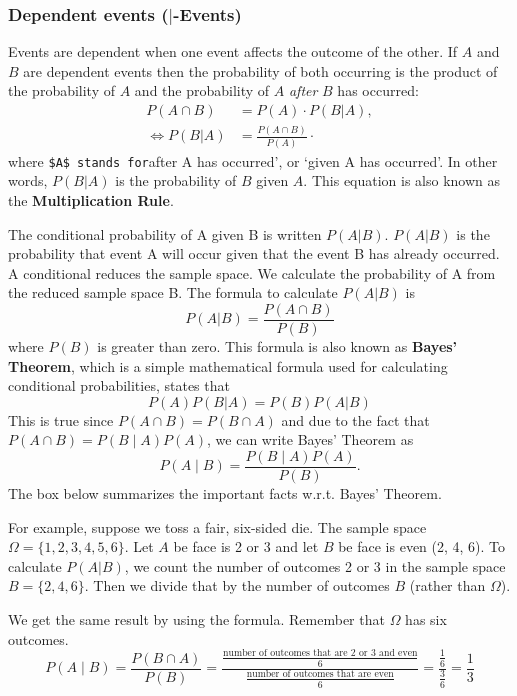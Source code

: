 \documentclass[
  12pt,
  oneside]{book}
\theoremstyle{definition}
\theoremstyle{definition}
\theoremstyle{definition}
\theoremstyle{definition}
\theoremstyle{remark}
\begin{document}
\hypertarget{dependent-events--events}{%
\subsubsection{\texorpdfstring{Dependent events (\(|\)-Events)}{Dependent events (\textbar-Events)}}\label{dependent-events--events}}

Events are dependent when one event affects the outcome of the other. If \(A\) and \(B\) are dependent events then the probability of both occurring is the product of the probability of \(A\) and the probability of \(A\) \emph{after} \(B\) has occurred:
\begin{align*}
    P(A \cap B)&=P(A)\cdot P(B|A),\\
    \Leftrightarrow P(B|A)&=\frac{P(A \cap B)}{P(A)}\cdot 
\end{align*}
where \texttt{\$\textbar{}A\$\textquotesingle{}\ stands\ for}after A has occurred', or `given A has occurred'. In other words, \(P(B|A)\) is the probability of \(B\) given \(A\). This equation is also known as the \textbf{Multiplication Rule}.

The conditional probability of A given B is written \(P(A|B)\). \(P(A|B)\) is the probability that event A will occur given that the event B has already occurred. A conditional reduces the sample space. We calculate the probability of A from the reduced sample space B. The formula to calculate \(P(A|B)\) is \[ P(A|B) = \frac{P\left(A\cap B\right)}{P\left(B\right)}\] where \(P(B)\) is greater than zero.
This formula is also known as \textbf{Bayes' Theorem}, which is a simple mathematical formula used for calculating conditional probabilities, states that
\[
P(A)P(B|A)=P(B)P(A|B)
\]
This is true since \(P(A \cap B)=P(B \cap A)\) and due to the fact that \(P(A\cap B)=P(B\mid A)P(A)\), we can write Bayes' Theorem as
\[P(A\mid B)={\frac {P(B\mid A)P(A)}{P(B)}}.\]
The box below summarizes the important facts w.r.t. Bayes' Theorem.

For example, suppose we toss a fair, six-sided die. The sample space \(\Omega = \{1, 2, 3, 4, 5, 6\}\). Let \(A\) be face is 2 or 3 and let \(B\) be face is even (2, 4, 6). To calculate \(P(A|B)\), we count the number of outcomes 2 or 3 in the sample space \(B = \{2, 4, 6\}\). Then we divide that by the number of outcomes \(B\) (rather than \(\Omega\)).

We get the same result by using the formula. Remember that \(\Omega\) has six outcomes.
\[P(A\mid B)=\frac{P(B\cap A)}{P(B)} = \frac{\frac{\text{number of outcomes that are 2 or 3 and even}}{6}}{\frac{\text{number of outcomes that are even}}{6}}=\frac{\frac{1}{6}}{\frac{3}{6}}=\frac{1}{3} \]
\end{document}
